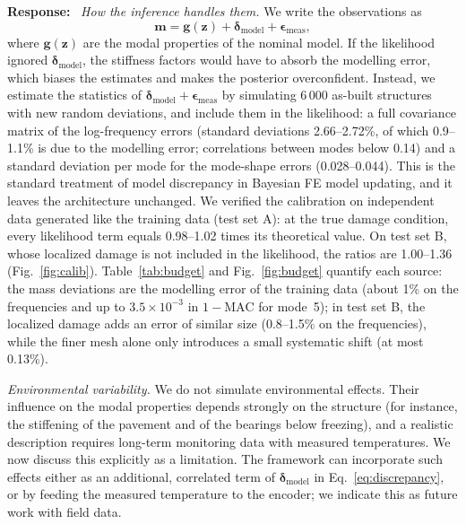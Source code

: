 \documentclass[11pt]{article}
\newenvironment{response}{\par\smallskip\noindent\color{resp}\textbf{Response:}\ }{\par}
\newcommand{\m}{\mathbf{m}}
\newcommand{\z}{\mathbf{z}}
\begin{document}
\begin{response}
\textit{How the inference handles them.} We write the observations as
\begin{equation}
\m=\mathbf{g}(\z)+\bm{\delta}_{\mathrm{model}}+\bm{\epsilon}_{\mathrm{meas}},
\label{eq:discrepancy}
\end{equation}
where $\mathbf{g}(\z)$ are the modal properties of the nominal model. If the likelihood ignored
$\bm{\delta}_{\mathrm{model}}$, the stiffness factors would have to absorb the modelling error, which biases the
estimates and makes the posterior overconfident. Instead, we estimate the statistics of
$\bm{\delta}_{\mathrm{model}}+\bm{\epsilon}_{\mathrm{meas}}$ by simulating 6\,000 as-built structures with new random
deviations, and include them in the likelihood: a full covariance matrix of the log-frequency errors (standard
deviations 2.66--2.72\%, of which 0.9--1.1\% is due to the modelling error; correlations between modes below 0.14) and
a standard deviation per mode for the mode-shape errors (0.028--0.044). This is the standard treatment of model
discrepancy in Bayesian FE model updating, and it leaves the architecture unchanged. We verified the calibration on
independent data generated like the training data (test set A): at the true damage condition, every likelihood term
equals 0.98--1.02 times its theoretical value. On test set B, whose localized damage is not included in the likelihood,
the ratios are 1.00--1.36 (Fig.~\ref{fig:calib}). Table~\ref{tab:budget} and Fig.~\ref{fig:budget} quantify each
source: the mass deviations are the modelling error of the training data (about 1\% on the frequencies and up to
$3.5\times10^{-3}$ in $1-\mathrm{MAC}$ for mode~5); in test set B, the localized damage adds an error of similar size
(0.8--1.5\% on the frequencies), while the finer mesh alone only introduces a small systematic shift (at most 0.13\%).

\textit{Environmental variability.} We do not simulate environmental effects. Their influence on the modal properties
depends strongly on the structure (for instance, the stiffening of the pavement and of the bearings below freezing), and
a realistic description requires long-term monitoring data with measured temperatures. We now discuss this explicitly
as a limitation. The framework can incorporate such effects either as an additional, correlated term of
$\bm{\delta}_{\mathrm{model}}$ in Eq.~\eqref{eq:discrepancy}, or by feeding the measured temperature to the encoder; we
indicate this as future work with field data.
\end{response}
\end{document}

